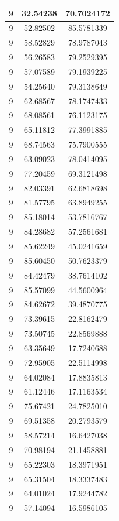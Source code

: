 \documentclass[
]{book}
\begin{document}
\begin{tabular}{c|c|c}
\hline
9 & 32.54238 & 70.7024172\\
\hline
9 & 52.82502 & 85.5781339\\
\hline
9 & 58.52829 & 78.9787043\\
\hline
9 & 56.26583 & 79.2529395\\
\hline
9 & 57.07589 & 79.1939225\\
\hline
9 & 54.25640 & 79.3138649\\
\hline
9 & 62.68567 & 78.1747433\\
\hline
9 & 68.08561 & 76.1123175\\
\hline
9 & 65.11812 & 77.3991885\\
\hline
9 & 68.74563 & 75.7900555\\
\hline
9 & 63.09023 & 78.0414095\\
\hline
9 & 77.20459 & 69.3121498\\
\hline
9 & 82.03391 & 62.6818698\\
\hline
9 & 81.57795 & 63.8949255\\
\hline
9 & 85.18014 & 53.7816767\\
\hline
9 & 84.28682 & 57.2561681\\
\hline
9 & 85.62249 & 45.0241659\\
\hline
9 & 85.60450 & 50.7623379\\
\hline
9 & 84.42479 & 38.7614102\\
\hline
9 & 85.57099 & 44.5600964\\
\hline
9 & 84.62672 & 39.4870775\\
\hline
9 & 73.39615 & 22.8162479\\
\hline
9 & 73.50745 & 22.8569888\\
\hline
9 & 63.35649 & 17.7240688\\
\hline
9 & 72.95905 & 22.5114998\\
\hline
9 & 64.02084 & 17.8835813\\
\hline
9 & 61.12446 & 17.1163534\\
\hline
9 & 75.67421 & 24.7825010\\
\hline
9 & 69.51358 & 20.2793579\\
\hline
9 & 58.57214 & 16.6427038\\
\hline
9 & 70.98194 & 21.1458881\\
\hline
9 & 65.22303 & 18.3971951\\
\hline
9 & 65.31504 & 18.3337483\\
\hline
9 & 64.01024 & 17.9244782\\
\hline
9 & 57.14094 & 16.5986105\\

\end{tabular}
\end{document}
